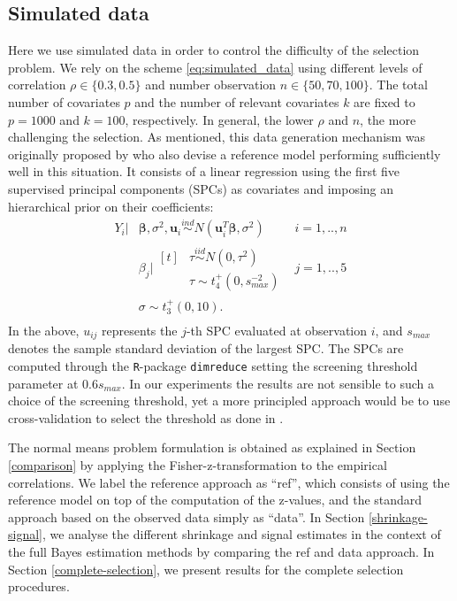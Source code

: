 \documentclass[american,]{article}
\theoremstyle{definition}
\begin{document}
\hypertarget{simulated-data}{%
\subsection{Simulated data}\label{simulated-data}}

Here we use simulated data in order to control the difficulty of the
selection problem. We rely on the scheme \eqref{eq:simulated_data}
using different levels of correlation $\rho\in\{0.3,0.5\}$ and number
observation $n\in\{50,70,100\}$. The total number of covariates $p$
and the number of relevant covariates $k$ are fixed to $p = 1000$ and
$k = 100$, respectively. In general, the lower $\rho$ and $n$, the
more challenging the selection. As mentioned, this data generation
mechanism was originally proposed by \cite{paper:projpred} who also
devise a reference model performing sufficiently well in this
situation. It consists of a linear regression using the first five
supervised principal components (SPCs) \citep{bair2006prediction,
  piironen2018} as covariates and imposing an hierarchical prior on
their coefficients: \
\begin{equation}
\label{eq:ref_mod}
\begin{aligned}
    Y_{i}|&\boldsymbol{\beta},\sigma^{2},\boldsymbol{u}_{i} \overset{ind}{\sim} N(\boldsymbol{u}_{i}^{T}\boldsymbol{\beta},\sigma^{2}) \quad &i=1,..,n \\
    &\beta_{j}|\!\begin{aligned}[t] &\tau \overset{iid}{\sim} N(0,\tau^{2})\\
    &\tau \sim t_{4}^{+}(0,s_{max}^{-2}) 
    \end{aligned} &j=1,..,5 \\ 
    &\sigma \sim t_{3}^{+}(0,10). \\
\end{aligned}
\end{equation}
In the above, $u_{ij}$ represents the $j$-th SPC evaluated at
observation $i$, and $s_{max}$ denotes the sample standard deviation
of the largest SPC.  The SPCs are computed through the
\texttt{R}-package \texttt{dimreduce} setting the screening threshold
parameter at $0.6s_{max}$.  In our experiments the results are not
sensible to such a choice of the screening threshold, yet a more
principled approach would be to use cross-validation to select the
threshold as done in \cite{paper:projpred}.

The normal means problem formulation is obtained as explained in
Section \ref{comparison} by applying the Fisher-z-transformation to
the empirical correlations. We label the reference approach as
``ref'', which consists of using the reference model on top of the
computation of the z-values, and the standard approach based on the
observed data simply as ``data''. In Section \ref{shrinkage-signal},
we analyse the different shrinkage and signal estimates in the context
of the full Bayes estimation methods by comparing the ref and data
approach. In Section \ref{complete-selection}, we present results for
the complete selection procedures.
\end{document}
